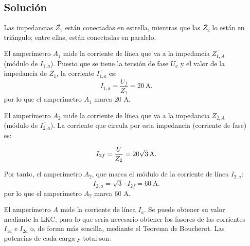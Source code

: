 \subsection*{Solución}
Las impedancias $\overline{Z_1}$ están conectadas en estrella, mientras que las $\overline{Z_2}$ lo están en triángulo; entre ellas, están conectadas en paralelo. 

El amperímetro $A_1$ mide la corriente de línea que va a la impedancia $\overline{Z_{1,A}}$ (módulo de $\overline{I_{1,a}}$). Puesto que se tiene la tensión de fase $\overline{U_{a}}$ y el valor de la impedancia de $\overline{Z_1}$, la corriente $\overline{I_{1,a}}$ es:
\begin{equation*}
    I_{1,a} = \frac{U_f}{Z_1} = \qty{20}{\ampere}.
\end{equation*}
por lo que el amperímetro $A_1$ marca 20 A. 

El amperímetro $A_2$ mide la corriente de línea que va a la impedancia $\overline{Z_{2,A}}$ (módulo de $\overline{I_{2,a}}$). La corriente que circula por esta impedancia (corriente de fase) es:

\begin{equation*}
    I_{2f} = \frac{U}{Z_2} = \qty[parse-numbers = false]{20\sqrt{3}}{\ampere}.
\end{equation*}

Por tanto, el amperímetro $A_2$, que marca el módulo de la corriente de línea $I_{2,a}$: 
\begin{equation*}
    I_{2,a}= \sqrt{3}\cdot I_{2f} = \qty{60}{\ampere}.
\end{equation*}
por lo que el amperímetro $A_2$ marca 60 A.

El amperímetro $A$ mide la corriente de línea $I_a$. Se puede obtener su valor mediante la LKC, para lo que sería necesario obtener los fasores de las corrientes $I_{1a}$ e $I_{2a}$ o, de forma más sencilla, mediante el Teorema de Boucherot. Las potencias de cada carga y total son:

